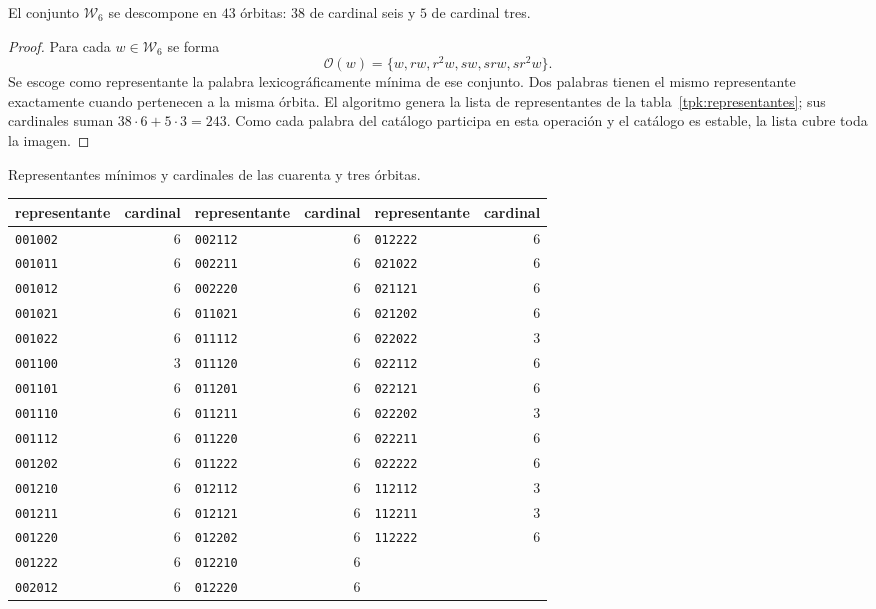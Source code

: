 \begin{proposicion}
\label{tpk:43}
El conjunto \(\mathcal W_6\) se descompone en \(43\) órbitas: \(38\)
de cardinal seis y \(5\) de cardinal tres.
\end{proposicion}
\begin{proof}
Para cada \(w\in\mathcal W_6\) se forma
\[
 \mathcal O(w)=\{w,rw,r^2w,sw,srw,sr^2w\}.
\]
Se escoge como representante la palabra lexicográficamente mínima de ese
conjunto. Dos palabras tienen el mismo representante exactamente cuando
pertenecen a la misma órbita. El algoritmo genera la lista de representantes
de la tabla~\ref{tpk:representantes}; sus cardinales suman
\(38\cdot6+5\cdot3=243\). Como cada palabra del catálogo participa en
esta operación y el catálogo es estable, la lista cubre toda la imagen.
\end{proof}

\begin{tablacompleta}[htbp]
\caption{Representantes mínimos y cardinales de las cuarenta y tres órbitas.}
\label{tpk:representantes}
\small
\begin{tabular}{@{}lr@{\qquad}lr@{\qquad}lr@{}}
\toprule
representante&cardinal&representante&cardinal&representante&cardinal\\
\midrule
\texttt{001002}&6&\texttt{002112}&6&\texttt{012222}&6\\
\texttt{001011}&6&\texttt{002211}&6&\texttt{021022}&6\\
\texttt{001012}&6&\texttt{002220}&6&\texttt{021121}&6\\
\texttt{001021}&6&\texttt{011021}&6&\texttt{021202}&6\\
\texttt{001022}&6&\texttt{011112}&6&\texttt{022022}&3\\
\texttt{001100}&3&\texttt{011120}&6&\texttt{022112}&6\\
\texttt{001101}&6&\texttt{011201}&6&\texttt{022121}&6\\
\texttt{001110}&6&\texttt{011211}&6&\texttt{022202}&3\\
\texttt{001112}&6&\texttt{011220}&6&\texttt{022211}&6\\
\texttt{001202}&6&\texttt{011222}&6&\texttt{022222}&6\\
\texttt{001210}&6&\texttt{012112}&6&\texttt{112112}&3\\
\texttt{001211}&6&\texttt{012121}&6&\texttt{112211}&3\\
\texttt{001220}&6&\texttt{012202}&6&\texttt{112222}&6\\
\texttt{001222}&6&\texttt{012210}&6&&\\
\texttt{002012}&6&\texttt{012220}&6&&\\
\bottomrule
\end{tabular}
\end{tablacompleta}


